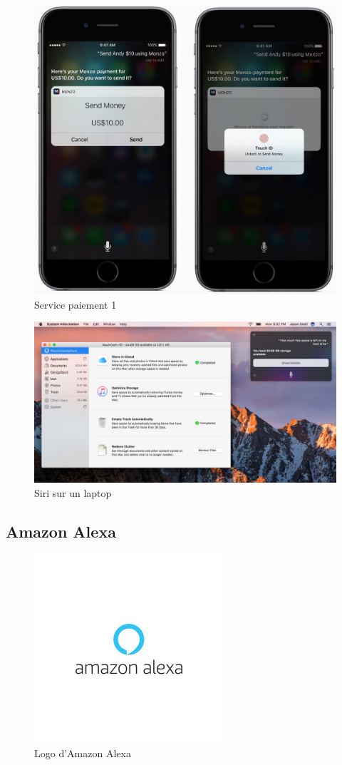\begin{figure}[H]
	\centering
	\includegraphics[width=0.5\linewidth]{images/apple_siri/cashconfirm.jpg} 
	\caption{Service paiement 1 \cite{siriDemo}}
\end{figure}

\begin{figure}[H]
	\centering
	\includegraphics[width=0.75\linewidth]{images/apple_siri/macbook.png} 
	\caption{Siri sur un laptop  \cite{macossiridemo}}
\end{figure}


\subsection*{Amazon Alexa}
\begin{figure}[H]
	\centering
	\includegraphics[width=.5\linewidth]{images/amazon_alexa/logo.png}
	\caption{Logo d'Amazon Alexa} 
\end{figure}
